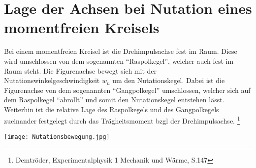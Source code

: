 

\section{Lage der Achsen bei Nutation eines momentfreien Kreisels}

Bei einem momentfreien Kreisel ist die Drehimpulsachse fest im Raum. Diese wird umschlossen von dem sogenannten \enquote{Raspolkegel}, welcher auch fest im Raum steht. Die Figurenachse bewegt sich mit der Nutationswinkelgeschwindigkeit $w_n$ um den Nutationskegel. Dabei ist die Figurenachse von dem sogenannten \enquote{Gangpolkegel} umschlossen, welcher sich auf dem Raspolkegel \enquote{abrollt} und somit den Nutationskegel entstehen lässt. Weiterhin ist die relative Lage des Raspolkegels und des Gangpolkegels zueinander festgelegt durch das Trägheitsmoment bzgl der Drehimpulsachse. \footnote{Demtröder, Experimentalphysik 1 Mechanik und Wärme, S.147}
\begin{center}
    \texttt{[image: Nutationsbewegung.jpg]}
\end{center}